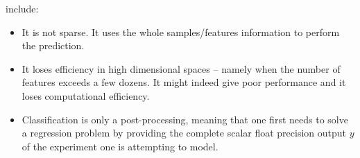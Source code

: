  include:                          \begin{itemize}                            \item It is not
 sparse.                            It uses the whole samples/features information to perform the
 prediction.                            \item It loses efficiency in high dimensional spaces –
 namely when the                            number of features exceeds a few dozens.
 It might indeed give poor performance and it loses computational efficiency.
 \item Classification is only a post-processing, meaning that one first needs
 to solve a regression problem by providing the complete scalar float precision
 output $y$ of the experiment one is attempting to model.                          \end{itemize}

